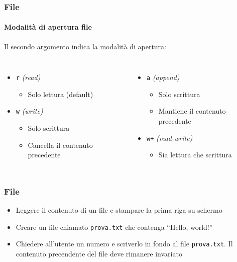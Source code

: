 \begin{contentframe}
    \frametitle{File}
    \framesubtitle{Modalità di apertura file}

    Il secondo argomento indica la modalità di apertura:
    
    \begin{columns}
        \begin{itemize}
            \item \texttt{r} \textit{(read)}
            \begin{itemize}
                \item Solo lettura (default)
            \end{itemize}
            \item \texttt{w} \textit{(write)}
            \begin{itemize}
                \item Solo scrittura
                \item Cancella il contenuto precedente
            \end{itemize}
        \end{itemize}
    
        \begin{itemize}
            \item \texttt{a} \textit{(append)}
            \begin{itemize}
                \item Solo scrittura
                \item Mantiene il contenuto precedente
            \end{itemize}
            \item \texttt{w+} \textit{(read-write)}
            \begin{itemize}
                \item Sia lettura che scrittura
            \end{itemize}
        \end{itemize}
    \end{columns}
\end{contentframe}

\begin{exerciseframe}
    \frametitle{File}

    \begin{itemize}
        \item Leggere il contenuto di un file e stampare la prima riga su schermo
        \bigskip
        \item Creare un file chiamato \texttt{prova.txt} che contenga ``Hello, world!''
        \bigskip
        \item Chiedere all'utente un numero e scriverlo in fondo al file \texttt{prova.txt}. Il contenuto precendente del file deve rimanere invariato
    \end{itemize}
\end{exerciseframe}



